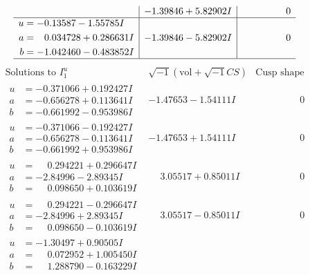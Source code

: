 \documentclass[1p]{elsarticle_modified}
\theoremstyle{definition}
\newcommand{\I}{\sqrt{-1}}
\begin{document}
$$\begin{array}{c|c|c}
 & -1.39846 + 5.82902 I & \phantom{-0.000000 } 0 \\ \hline\begin{aligned}
u &= -0.13587 - 1.55785 I \\
a &= \phantom{-}0.034728 + 0.286631 I \\
b &= -1.042460 - 0.483852 I\end{aligned}
 & -1.39846 - 5.82902 I & \phantom{-0.000000 } 0\\
 \hline 
 \end{array}$$\newpage$$\begin{array}{c|c|c}  
\text{Solutions to }I^u_{1}& \I (\text{vol} + \sqrt{-1}CS) & \text{Cusp shape}\\
 \hline 
\begin{aligned}
u &= -0.371066 + 0.192427 I \\
a &= -0.656278 + 0.113641 I \\
b &= -0.661992 - 0.953986 I\end{aligned}
 & -1.47653 - 1.54111 I & \phantom{-0.000000 } 0 \\ \hline\begin{aligned}
u &= -0.371066 - 0.192427 I \\
a &= -0.656278 - 0.113641 I \\
b &= -0.661992 + 0.953986 I\end{aligned}
 & -1.47653 + 1.54111 I & \phantom{-0.000000 } 0 \\ \hline\begin{aligned}
u &= \phantom{-}0.294221 + 0.296647 I \\
a &= -2.84996 - 2.89345 I \\
b &= \phantom{-}0.098650 + 0.103619 I\end{aligned}
 & \phantom{-}3.05517 + 0.85011 I & \phantom{-0.000000 } 0 \\ \hline\begin{aligned}
u &= \phantom{-}0.294221 - 0.296647 I \\
a &= -2.84996 + 2.89345 I \\
b &= \phantom{-}0.098650 - 0.103619 I\end{aligned}
 & \phantom{-}3.05517 - 0.85011 I & \phantom{-0.000000 } 0 \\ \hline\begin{aligned}
u &= -1.30497 + 0.90505 I \\
a &= \phantom{-}0.072952 + 1.005450 I \\
b &= \phantom{-}1.288790 - 0.163229 I\end{aligned}

\end{array}$$
\end{document}
